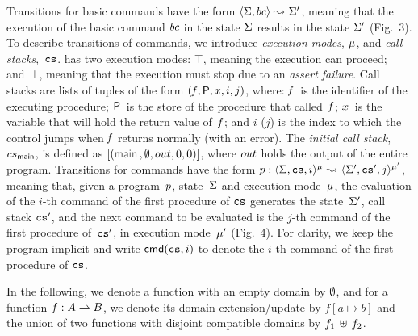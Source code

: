 \noindent Transitions for basic commands have the form 
{\small $\langle \Sigma, bc \rangle \leadsto_{} \Sigma'$}, meaning that the execution of the basic command 
$bc$ in the state $\Sigma$ results in the state $\Sigma'$ (Fig.~3). 
%
To describe transitions of commands, we introduce \emph{execution modes}, $\mu$, and 
\emph{call stacks},~$\mathtt{cs}$.  \jsil has two execution modes: 
$\top$, meaning the execution can proceed; and~$\bot$, meaning that the execution must stop due to an \emph{assert failure}. Call stacks are lists of tuples of the form $(\mathit{f}, {\sf P}, x, i, j)$, where: 
$\mathit{f}$~is the identifier of the executing procedure;
${\sf P}$~is the store of the procedure that called~$\mathit{f}$; 
$x$~is the variable that will hold the return value of~$\mathit{f}$; %
and $i$ ($j$) is the index to which the control jumps when $\mathit{f}$ returns normally (with an error). 
The \emph{initial call stack}, $cs_{\sf main}$, is defined as {\small $[ (\jsilmain, \storeemp, \jsilout, 0, 0) ]$}, where ${\small out}$ holds the output of the entire program.  
Transitions for  commands have the form  {\small $p: \langle \Sigma, \mathtt{cs}, i \rangle^{\mu} \leadsto_{} \langle \Sigma', \mathtt{cs}', j \rangle^{\mu'}$}, 
meaning that, given a program~$p$, state~$\Sigma$ and execution mode~$\mu$, the evaluation of the $i$-th command of the first procedure of %
$\mathtt{cs}$ generates 
the state~$\Sigma'$, call stack $\mathtt{cs}'$,  and the next command to be evaluated is the $j$-th command of the first procedure 
of~$\mathtt{cs}'$, in execution mode~$\mu'$ (Fig.~4). 
For clarity, we keep the program implicit and write {\small $\ccmd{\abscs, i}$} to denote the $i$-th command of the first procedure of $\mathtt{cs}$.

 In the following, we denote a function with an empty domain by $\emptyset$, and for a function $f : A \rightharpoonup B$, we denote its domain extension/update by $f[a \mapsto b]$ %
and the union of two functions with disjoint compatible domains by $f_1 \, \uplus \, f_2$. 

